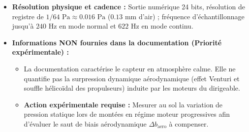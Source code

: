 \documentclass[../Formulations_Kalman.tex]{subfiles}
\begin{document}
\begin{itemize}
\begin{itemize}
        \item Coefficient thermique d'offset (TCO) : $\pm 0.5\text{ Pa/K}$ (soit une sensibilité thermique d'environ $4.1\text{ cm/K}$).
        \item Dérive de soudage (Solder drift) : $\pm 30\text{ Pa}$ ($\pm 0.3\text{ hPa}$).
    \end{itemize}
    \item \textbf{Résolution physique et cadence :} Sortie numérique 24 bits, résolution de registre de $1/64\text{ Pa} \approx 0.016\text{ Pa}$ ($0.13\text{ mm}$ d'air) ; fréquence d'échantillonnage jusqu'à $240\text{ Hz}$ en mode normal et $622\text{ Hz}$ en mode continu.
    \item \textbf{Informations NON fournies dans la documentation (Priorité expérimentale) :}
    \begin{itemize}
        \item La documentation caractérise le capteur en atmosphère calme. Elle ne quantifie pas la surpression dynamique aérodynamique (effet Venturi et souffle hélicoïdal des propulseurs) induite par les moteurs du dirigeable.
        \item \textbf{Action expérimentale requise :} Mesurer au sol la variation de pression statique lors de montées en régime moteur progressives afin d'évaluer le saut de biais aérodynamique $\Delta b_{\text{aero}}$ à compenser.
    \end{itemize}
\end{itemize}
\end{document}

